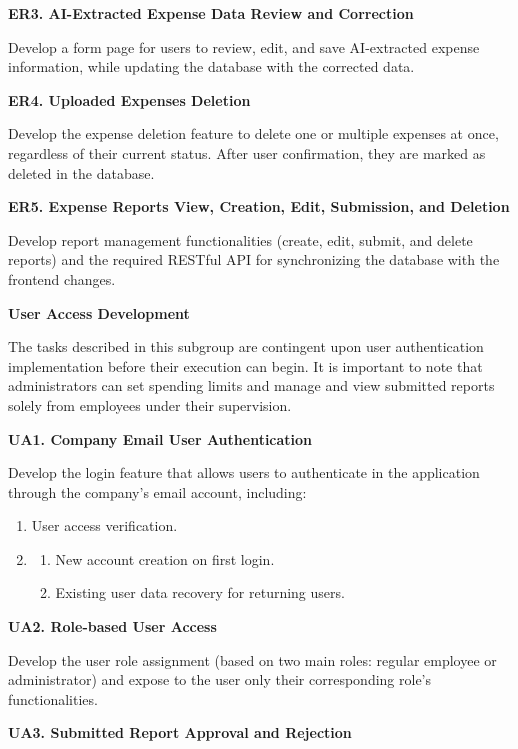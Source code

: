 \textbf{ER3. AI-Extracted Expense Data Review and Correction}

Develop a form page for users to review, edit, and save AI-extracted expense information, while updating the database with the corrected data.

\textbf{ER4. Uploaded Expenses Deletion}

Develop the expense deletion feature to delete one or multiple expenses at once, regardless of their current status. After user confirmation, they are marked as deleted in the database. 

\textbf{ER5. Expense Reports View, Creation, Edit, Submission, and Deletion}

Develop report management functionalities (create, edit, submit, and delete reports) and the required RESTful API for synchronizing the database with the frontend changes.


\textbf{User Access Development}

The tasks described in this subgroup are contingent upon user authentication implementation before their execution can begin. It is important to note that administrators can set spending limits and manage and view submitted reports solely from employees under their supervision.

\textbf{UA1. Company Email User Authentication}

Develop the login feature that allows users to authenticate in the application through the company's email account, including: 

\vspace{-5pt}
\begin{enumerate}[noitemsep, leftmargin=0.75cm]
    \item User access verification.
    \item 
    \begin{enumerate} 
        \item New account creation on first login.
        \item Existing user data recovery for returning users.
    \end{enumerate}
\end{enumerate}

\textbf{UA2. Role-based User Access}

Develop the user role assignment (based on two main roles: regular employee or administrator) and expose to the user only their corresponding role's functionalities. 

\textbf{UA3. Submitted Report Approval and Rejection}

